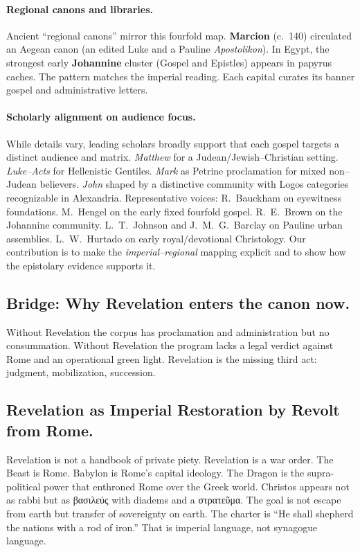 \paragraph{Regional canons and libraries.}
Ancient “regional canons” mirror this fourfold map.
\textbf{Marcion} (c.~140) circulated an Aegean canon (an edited Luke and a Pauline \textit{Apostolikon}).
In Egypt, the strongest early \textbf{Johannine} cluster (Gospel and Epistles) appears in papyrus caches.
The pattern matches the imperial reading.
Each capital curates its banner gospel and administrative letters.

\paragraph{Scholarly alignment on audience focus.}
While details vary, leading scholars broadly support that each gospel targets a distinct audience and matrix.
\textit{Matthew} for a Judean/Jewish–Christian setting.
\textit{Luke–Acts} for Hellenistic Gentiles.
\textit{Mark} as Petrine proclamation for mixed non–Judean believers.
\textit{John} shaped by a distinctive community with Logos categories recognizable in Alexandria.
Representative voices: R.~Bauckham on eyewitness foundations.
M.~Hengel on the early fixed fourfold gospel.
R.~E.~Brown on the Johannine community.
L.~T.~Johnson and J.~M.~G.~Barclay on Pauline urban assemblies.
L.~W.~Hurtado on early royal/devotional Christology.
Our contribution is to make the \emph{imperial–regional} mapping explicit and to show how the epistolary evidence supports it.

\subsection{Bridge: Why Revelation enters the canon now.}\label{subsec:bridge-why-revelation-enters-the-canon-now}
Without Revelation the corpus has proclamation and administration but no consummation.
Without Revelation the program lacks a legal verdict against Rome and an operational green light.
Revelation is the missing third act: judgment, mobilization, succession.

\subsection{Revelation as Imperial Restoration by Revolt from Rome.}\label{subsec:revelation-as-imperial-restoration-by-revolt-from-rome}
Revelation is not a handbook of private piety.
Revelation is a war order.
The Beast is Rome.
Babylon is Rome’s capital ideology.
The Dragon is the supra-political power that enthroned Rome over the Greek world.
Christos appears not as rabbi but as βασιλεύς with diadems and a στρατεῦμα.
The goal is not escape from earth but transfer of sovereignty on earth.
The charter is “He shall shepherd the nations with a rod of iron.”
That is imperial language, not synagogue language.

